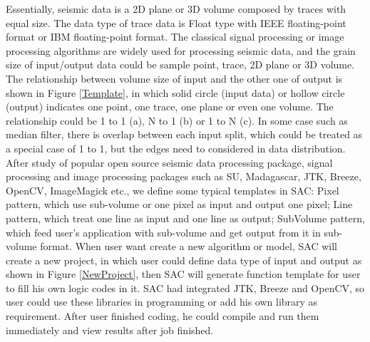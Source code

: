 
Essentially, seismic data is a 2D plane or 3D volume composed by traces with equal size. The data type of trace data is Float type with IEEE floating-point format or IBM floating-point format. The classical signal processing or image processing algorithms are widely used for processing seismic data, and the grain size of input/output data could be sample point, trace, 2D plane or 3D volume. The relationship between volume size of input and the other one of output is shown in Figure \ref{Template}, in which solid circle (input data) or hollow circle (output) indicates one point, one trace, one plane or even one volume. The relationship could be 1 to 1 (a), N to 1 (b) or 1 to N (c). In some case such as median filter, there is overlap between each input split, which could be treated as a special case of 1 to 1, but the edges need to considered in data distribution. After study of popular open source seismic data processing package, signal processing and image processing packages such as SU, Madagascar, JTK, Breeze, OpenCV, ImageMagick etc., we define some typical templates in SAC: Pixel pattern, which use sub-volume or one pixel as input and output one pixel; Line pattern, which treat one line as input and one line as output; SubVolume pattern, which feed user’s application with sub-volume and get output from it in sub-volume format. When user want create a new algorithm or model, SAC will create a new project, in which user could define data type of input and output as shown in Figure \ref{NewProject}, then SAC will generate function template for user to fill his own logic codes in it. SAC had integrated JTK, Breeze and OpenCV, so user could use these libraries in programming or add his own library as requirement. After user finished coding, he could compile and run them immediately and view results after job finished.     

